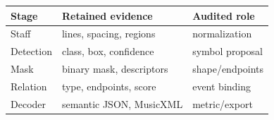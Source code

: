 \begin{center}
\begin{minipage}{\columnwidth}
\label{tab:artifact-audit}
\centering
\footnotesize
\setlength{\tabcolsep}{2.3pt}
\begin{tabular}{@{}lll@{}}
\toprule
Stage & Retained evidence & Audited role \\
\midrule
Staff & lines, spacing, regions & normalization \\
Detection & class, box, confidence & symbol proposal \\
Mask & binary mask, descriptors & shape/endpoints \\
Relation & type, endpoints, score & event binding \\
Decoder & semantic JSON, MusicXML & metric/export \\
\bottomrule
\end{tabular}
\end{minipage}
\end{center}
